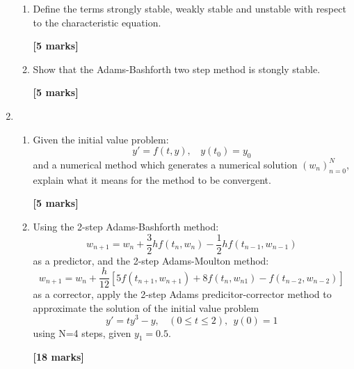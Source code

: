 \begin{enumerate}
\begin{enumerate}
\item
Define the terms strongly stable, weakly stable and unstable with respect to the
characteristic equation.
\begin{flushright}
\textbf{[5 marks]}
\end{flushright}
\item
Show that the Adams-Bashforth two step method is  stongly stable.
\begin{flushright}
\textbf{[5 marks]}
\end{flushright}
\end{enumerate}

\item
\begin{enumerate}
\item
Given the initial value problem: 
\[ y'=f(t,y), \ \ \ \  y(t_0)=y_0 \]
and a numerical method which generates a numerical solution $(w_n)_{n=0}^{N}$, explain what it means for the method to be convergent.
\begin{flushright}
\textbf{[5 marks]}
\end{flushright}
\item
Using the 2-step Adams-Bashforth method:
\[ w_{n+1}=w_n+\frac{3}{2}hf(t_n,w_n)-\frac{1}{2}hf(t_{n-1},w_{n-1})\] 
as a predictor, and the 2-step Adams-Moulton method: 
\[w_{n+1}=w_n + \frac{h}{12}[5f(t_{n+1},w_{n+1})+8f(t_{n},w_{n1})-f(t_{n-2},w_{n-2})] \]
as a corrector, apply the 2-step Adams predicitor-corrector method to approximate the solution of the initial value problem
\[y'=ty^3-y, \ \ \ \  (0\leq t \leq 2), \ \ y(0)=1 \]
using N=4 steps, given $y_1=0.5$.
\begin{flushright}
\textbf{[18 marks]}
\end{flushright}


\end{enumerate}
\end{enumerate}
